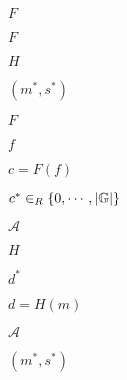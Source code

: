 \documentclass[10pt]{book}
\begin{document}
\begin{mdSnippets}
\begin{mdInlineSnippet}[800618943025315f869e4e1f09471012]
$F$\end{mdInlineSnippet}%
\begin{mdInlineSnippet}[800618943025315f869e4e1f09471012]%
$F$\end{mdInlineSnippet}%
\begin{mdInlineSnippet}[c1d9f50f86825a1a2302ec2449c17196]%
$H$\end{mdInlineSnippet}%
\begin{mdInlineSnippet}[3a7102c8b54f8813870cc6a2fb003a98]%
$(m^*, s^*)$\end{mdInlineSnippet}%
\begin{mdInlineSnippet}[800618943025315f869e4e1f09471012]%
$F$\end{mdInlineSnippet}%
\begin{mdInlineSnippet}%
$f$\end{mdInlineSnippet}%
\begin{mdInlineSnippet}[66e87b7ff3535762373f8420a8c26b46]%
$c = F(f)$\end{mdInlineSnippet}%
\begin{mdInlineSnippet}[49c145525d29d15a616c70c43bff860b]%
$c^* \in_R \{0, \cdots, |\mathbb{G}|\}$\end{mdInlineSnippet}%
\begin{mdInlineSnippet}[ad70146b431bea9ae74cf8385470c544]%
$\mathcal{A}$\end{mdInlineSnippet}%
\begin{mdInlineSnippet}[c1d9f50f86825a1a2302ec2449c17196]%
$H$\end{mdInlineSnippet}%
\begin{mdInlineSnippet}[5c4a1215e6cb04217e1cc85c19b535dc]%
$d^*$\end{mdInlineSnippet}%
\begin{mdInlineSnippet}%
$d = H(m)$\end{mdInlineSnippet}%
\begin{mdInlineSnippet}[ad70146b431bea9ae74cf8385470c544]%
$\mathcal{A}$\end{mdInlineSnippet}%
\begin{mdInlineSnippet}%
$(m^*,s^*)$\end{mdInlineSnippet}%

\end{mdSnippets}
\end{document}
